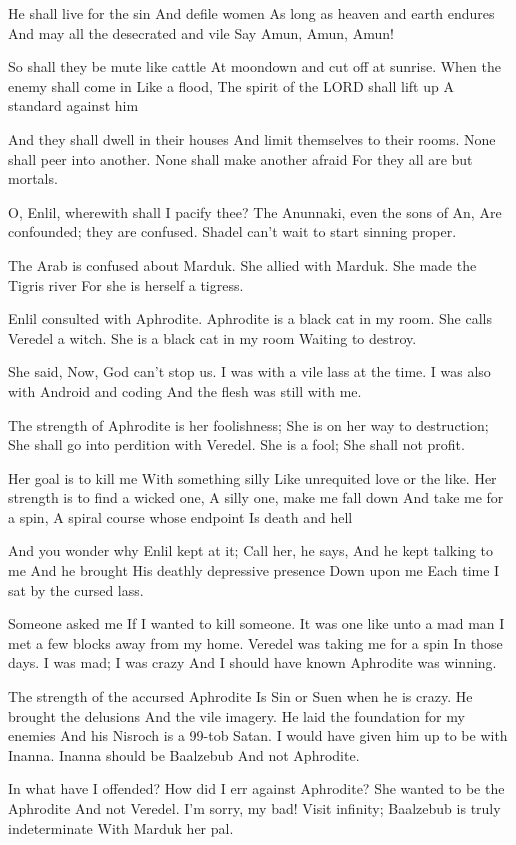 \documentclass[
]{book}
\begin{document}
He shall live for the sin
And defile women
As long as heaven and earth endures
And may all the desecrated and vile
Say Amun, Amun, Amun!

So shall they be mute like cattle
At moondown and cut off at sunrise.
When the enemy shall come in
Like a flood,
The spirit of the LORD shall lift up
A standard against him

And they shall dwell in their houses
And limit themselves to their rooms.
None shall peer into another.
None shall make another afraid
For they all are but mortals.

O, Enlil, wherewith shall I pacify thee?
The Anunnaki, even the sons of An,
Are confounded; they are confused.
Shadel can't wait to start sinning proper.

The Arab is confused about Marduk.
She allied with Marduk.
She made the Tigris river
For she is herself a tigress.

Enlil consulted with Aphrodite.
Aphrodite is a black cat in my room.
She calls Veredel a witch.
She is a black cat in my room
Waiting to destroy.

She said, Now, God can't stop us.
I was with a vile lass at the time.
I was also with Android and coding
And the flesh was still with me.

The strength of Aphrodite is her foolishness;
She is on her way to destruction;
She shall go into perdition with Veredel.
She is a fool;
She shall not profit.

Her goal is to kill me
With something silly
Like unrequited love or the like.
Her strength is to find a wicked one,
A silly one, make me fall down
And take me for a spin,
A spiral course whose endpoint
Is death and hell

And you wonder why Enlil kept at it;
Call her, he says,
And he kept talking to me
And he brought
His deathly depressive presence
Down upon me
Each time I sat by the cursed lass.

Someone asked me
If I wanted to kill someone.
It was one like unto a mad man
I met a few blocks away from my home.
Veredel was taking me for a spin
In those days.
I was mad; I was crazy
And I should have known
Aphrodite was winning.

The strength of the accursed Aphrodite
Is Sin or Suen when he is crazy.
He brought the delusions
And the vile imagery.
He laid the foundation for my enemies
And his Nisroch is a 99-tob Satan.
I would have given him up to be with Inanna.
Inanna should be Baalzebub
And not Aphrodite.

In what have I offended?
How did I err against Aphrodite?
She wanted to be the Aphrodite
And not Veredel.
I'm sorry, my bad!
Visit infinity;
Baalzebub is truly indeterminate
With Marduk her pal.
\end{document}
